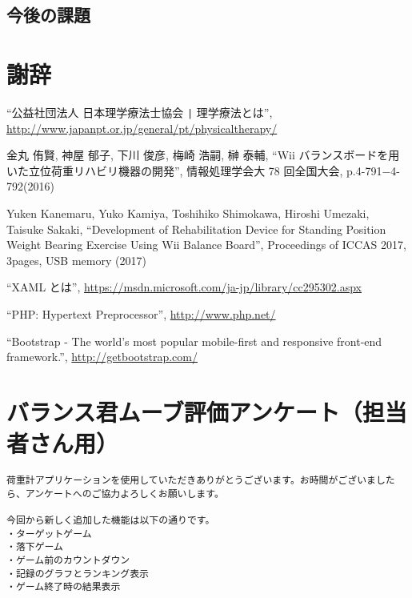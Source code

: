 \documentclass[uplatex,a4paper,12pt]{jsreport}
\begin{document}
\section{今後の課題}\label{sec:kadai}



\chapter*{謝辞}


\begin{thebibliography}{99}%

   ``公益社団法人 日本理学療法士協会 \verb+|+ 理学療法とは'',
  \url{http://www.japanpt.or.jp/general/pt/physicaltherapy/}
    
   金丸 侑賢, 神屋 郁子, 下川 俊彦, 梅崎 浩嗣, 榊 泰輔,
  ``Wii バランスボードを用いた立位荷重リハビリ機器の開発'', 
  情報処理学会大 78 回全国大会, p.4-791$−$4-792(2016)         

   Yuken Kanemaru, Yuko Kamiya, Toshihiko Shimokawa, Hiroshi Umezaki, Taisuke Sakaki, 
  ``Development of Rehabilitation Device for Standing Position Weight Bearing Exercise Using Wii Balance Board'',
  Proceedings of ICCAS 2017, 3pages, USB memory (2017)    

   ``XAML とは'',
  \url{https://msdn.microsoft.com/ja-jp/library/cc295302.aspx}

   ``PHP: Hypertext Preprocessor'',
  \url{ http://www.php.net/ }

   ``Bootstrap - The world's most popular mobile-first and responsive front-end framework.'',      
  \url{ http://getbootstrap.com/ }

\end{thebibliography}

\appendix

\chapter{バランス君ムーブ評価アンケート（担当者さん用）}\label{h:tantou}

\begin{verbatim}
荷重計アプリケーションを使用していただきありがとうございます。お時間がございましたら、アンケートへのご協力よろしくお願いします。

今回から新しく追加した機能は以下の通りです。
・ターゲットゲーム
・落下ゲーム
・ゲーム前のカウントダウン
・記録のグラフとランキング表示
・ゲーム終了時の結果表示
\end{verbatim}
\end{document}
